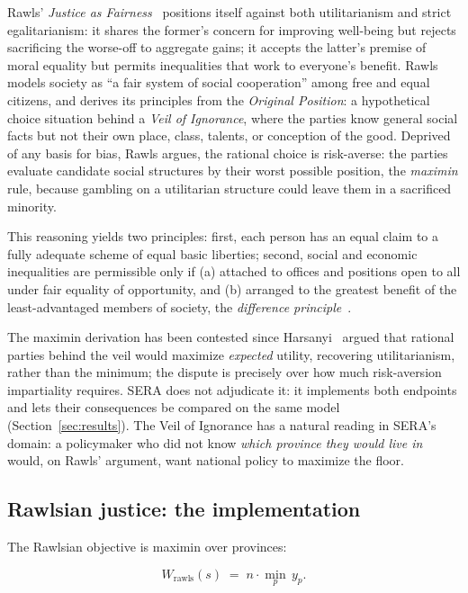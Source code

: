 \documentclass[11pt,a4paper]{article}
\begin{document}
Rawls' \emph{Justice as Fairness}~\cite{rawls1971, rawls2001, wenar2025}
positions itself against both utilitarianism and strict egalitarianism: it
shares the former's concern for improving well-being but rejects sacrificing
the worse-off to aggregate gains; it accepts the latter's premise of moral
equality but permits inequalities that work to everyone's benefit. Rawls
models society as ``a fair system of social cooperation'' among free and equal
citizens, and derives its principles from the \emph{Original Position}: a
hypothetical choice situation behind a \emph{Veil of Ignorance}, where the
parties know general social facts but not their own place, class, talents,
or conception of the good. Deprived of any basis for bias, Rawls argues, the
rational choice is risk-averse: the parties evaluate candidate social
structures by their worst possible position, the \emph{maximin} rule,
because gambling on a utilitarian structure could leave them in a sacrificed
minority.

This reasoning yields two principles: first, each person has an equal claim to
a fully adequate scheme of equal basic liberties; second, social and economic
inequalities are permissible only if (a) attached to offices and positions open
to all under fair equality of opportunity, and (b) arranged to the greatest
benefit of the least-advantaged members of society, the \emph{difference
principle}~\cite{rawls2001}.

The maximin derivation has been contested since Harsanyi~\cite{harsanyi1975}
argued that rational parties behind the veil would maximize \emph{expected}
utility, recovering utilitarianism, rather than the minimum; the dispute
is precisely over how much risk-aversion impartiality requires. SERA does not
adjudicate it: it implements both endpoints and lets their consequences be
compared on the same model (Section~\ref{sec:results}). The Veil of Ignorance
has a natural reading in SERA's domain: a policymaker who did not know
\emph{which province they would live in} would, on Rawls' argument, want
national policy to maximize the floor.

\subsection{Rawlsian justice: the implementation}

The Rawlsian objective is maximin over provinces:

\begin{equation}
    W_{\text{rawls}}(s) \;=\; n \cdot \min_{p} \, y_p .
\end{equation}
\end{document}
